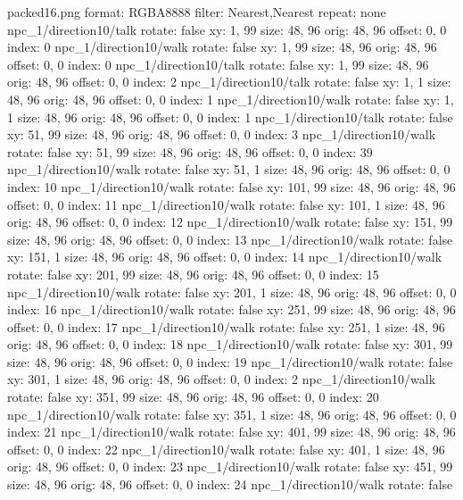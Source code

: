 packed16.png
format: RGBA8888
filter: Nearest,Nearest
repeat: none
npc_1/direction10/talk
  rotate: false
  xy: 1, 99
  size: 48, 96
  orig: 48, 96
  offset: 0, 0
  index: 0
npc_1/direction10/walk
  rotate: false
  xy: 1, 99
  size: 48, 96
  orig: 48, 96
  offset: 0, 0
  index: 0
npc_1/direction10/talk
  rotate: false
  xy: 1, 99
  size: 48, 96
  orig: 48, 96
  offset: 0, 0
  index: 2
npc_1/direction10/talk
  rotate: false
  xy: 1, 1
  size: 48, 96
  orig: 48, 96
  offset: 0, 0
  index: 1
npc_1/direction10/walk
  rotate: false
  xy: 1, 1
  size: 48, 96
  orig: 48, 96
  offset: 0, 0
  index: 1
npc_1/direction10/talk
  rotate: false
  xy: 51, 99
  size: 48, 96
  orig: 48, 96
  offset: 0, 0
  index: 3
npc_1/direction10/walk
  rotate: false
  xy: 51, 99
  size: 48, 96
  orig: 48, 96
  offset: 0, 0
  index: 39
npc_1/direction10/walk
  rotate: false
  xy: 51, 1
  size: 48, 96
  orig: 48, 96
  offset: 0, 0
  index: 10
npc_1/direction10/walk
  rotate: false
  xy: 101, 99
  size: 48, 96
  orig: 48, 96
  offset: 0, 0
  index: 11
npc_1/direction10/walk
  rotate: false
  xy: 101, 1
  size: 48, 96
  orig: 48, 96
  offset: 0, 0
  index: 12
npc_1/direction10/walk
  rotate: false
  xy: 151, 99
  size: 48, 96
  orig: 48, 96
  offset: 0, 0
  index: 13
npc_1/direction10/walk
  rotate: false
  xy: 151, 1
  size: 48, 96
  orig: 48, 96
  offset: 0, 0
  index: 14
npc_1/direction10/walk
  rotate: false
  xy: 201, 99
  size: 48, 96
  orig: 48, 96
  offset: 0, 0
  index: 15
npc_1/direction10/walk
  rotate: false
  xy: 201, 1
  size: 48, 96
  orig: 48, 96
  offset: 0, 0
  index: 16
npc_1/direction10/walk
  rotate: false
  xy: 251, 99
  size: 48, 96
  orig: 48, 96
  offset: 0, 0
  index: 17
npc_1/direction10/walk
  rotate: false
  xy: 251, 1
  size: 48, 96
  orig: 48, 96
  offset: 0, 0
  index: 18
npc_1/direction10/walk
  rotate: false
  xy: 301, 99
  size: 48, 96
  orig: 48, 96
  offset: 0, 0
  index: 19
npc_1/direction10/walk
  rotate: false
  xy: 301, 1
  size: 48, 96
  orig: 48, 96
  offset: 0, 0
  index: 2
npc_1/direction10/walk
  rotate: false
  xy: 351, 99
  size: 48, 96
  orig: 48, 96
  offset: 0, 0
  index: 20
npc_1/direction10/walk
  rotate: false
  xy: 351, 1
  size: 48, 96
  orig: 48, 96
  offset: 0, 0
  index: 21
npc_1/direction10/walk
  rotate: false
  xy: 401, 99
  size: 48, 96
  orig: 48, 96
  offset: 0, 0
  index: 22
npc_1/direction10/walk
  rotate: false
  xy: 401, 1
  size: 48, 96
  orig: 48, 96
  offset: 0, 0
  index: 23
npc_1/direction10/walk
  rotate: false
  xy: 451, 99
  size: 48, 96
  orig: 48, 96
  offset: 0, 0
  index: 24
npc_1/direction10/walk
  rotate: false
